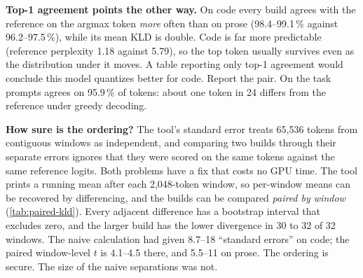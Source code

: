 \textbf{Top-1 agreement points the other way.} On code every build agrees with the reference on the
argmax token \emph{more} often than on prose (98.4--99.1\,\% against 96.2--97.5\,\%), while its mean
KLD is double. Code is far more predictable (reference perplexity 1.18 against 5.79), so the top token
usually survives even as the distribution under it moves. A table reporting only top-1 agreement would
conclude this model quantizes better for code. Report the pair. On the task prompts \Qfour{} agrees on
95.9\,\% of tokens: about one token in 24 differs from the reference under greedy decoding.

\textbf{How sure is the ordering?} The tool's standard error treats 65{,}536 tokens from contiguous
windows as independent, and comparing two builds through their separate errors ignores that they were
scored on the same tokens against the same reference logits. Both problems have a fix that costs no
GPU time. The tool prints a running mean after each 2{,}048-token window, so per-window means can be
recovered by differencing, and the builds can be compared \emph{paired by window}
(\cref{tab:paired-kld}). Every adjacent difference has a bootstrap interval that excludes zero, and
the larger build has the lower divergence in 30 to 32 of 32 windows. The naive calculation had given
8.7--18 ``standard errors'' on code; the paired window-level $t$ is 4.1--4.5 there, and 5.5--11 on
prose. The ordering is secure. The size of the naive separations was not.

\begin{table}[t]
\centering\small
\caption{Paired differences in mean KLD between builds, by window. Per-window means recovered from the
tool's running mean (printed to five decimals); percentile bootstrap over windows, $B=20{,}000$. Windows
are contiguous chunks of one corpus per domain, so the intervals cover window-to-window variation on
these corpora, not the choice of corpus.}\label{tab:paired-kld}
\end{table}

